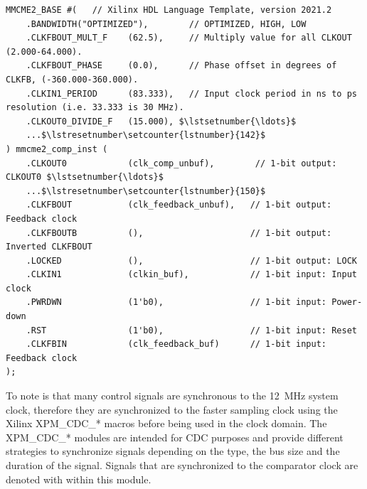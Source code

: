 \documentclass[
	english,
	ruledheaders=section, %
	class=report,%
	thesis={type=Project Seminar Report},%
	accentcolor=TUDa-1d, %
	custommargins=false,%
	marginpar=false,%
	parskip=half-,%
	fontsize=11pt,%
]{tudapub}
\makeatletter
\newcommand{\inlcode}[1]{\textit{\detokenize{#1}}}
\let\orig@lstnumber=\thelstnumber
\newcommand\lstsetnumber[1]{\gdef\thelstnumber{#1}}
\newcommand\lstresetnumber{\global\let\thelstnumber=\orig@lstnumber}
\makeatother
\begin{document}
\begin{lstlisting}[firstnumber=131,caption={MMCME2\_BASE instance of comparator\_driver},label=lst:comp1,mathescape=true]
MMCME2_BASE #(   // Xilinx HDL Language Template, version 2021.2
    .BANDWIDTH("OPTIMIZED"),        // OPTIMIZED, HIGH, LOW
    .CLKFBOUT_MULT_F    (62.5),     // Multiply value for all CLKOUT (2.000-64.000).
    .CLKFBOUT_PHASE     (0.0),      // Phase offset in degrees of CLKFB, (-360.000-360.000).
    .CLKIN1_PERIOD      (83.333),   // Input clock period in ns to ps resolution (i.e. 33.333 is 30 MHz).
    .CLKOUT0_DIVIDE_F   (15.000), $\lstsetnumber{\ldots}$
    ...$\lstresetnumber\setcounter{lstnumber}{142}$
) mmcme2_comp_inst (
    .CLKOUT0            (clk_comp_unbuf),        // 1-bit output: CLKOUT0 $\lstsetnumber{\ldots}$
    ...$\lstresetnumber\setcounter{lstnumber}{150}$
    .CLKFBOUT           (clk_feedback_unbuf),   // 1-bit output: Feedback clock
    .CLKFBOUTB          (),                     // 1-bit output: Inverted CLKFBOUT
    .LOCKED             (),                     // 1-bit output: LOCK
    .CLKIN1             (clkin_buf),            // 1-bit input: Input clock
    .PWRDWN             (1'b0),                 // 1-bit input: Power-down
    .RST                (1'b0),                 // 1-bit input: Reset
    .CLKFBIN            (clk_feedback_buf)      // 1-bit input: Feedback clock
);
\end{lstlisting}
To note is that many control signals are synchronous to the \SI{12}{\mega\hertz} system clock, therefore they are synchronized to the faster sampling clock using the Xilinx XPM\_CDC\_* macros \autocite{xilinxVivadoDesignSuite2023} before being used in the \inlcode{clk_comp} clock domain. The XPM\_CDC\_* modules are intended for \gls{CDC} purposes and provide different strategies to synchronize signals depending on the type, the bus size and the duration of the signal. Signals that are synchronized to the comparator clock are denoted with \inlcode{*_comp} within this module.
\end{document}

